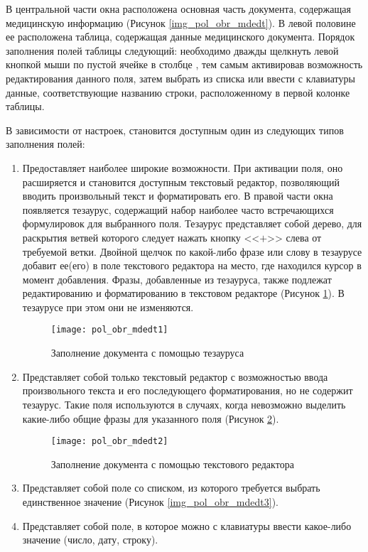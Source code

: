 В центральной части окна расположена основная часть документа, содержащая медицинскую информацию (Рисунок \ref{img_pol_obr_mdedt}). В левой половине ее расположена таблица, содержащая данные медицинского документа. Порядок заполнения полей таблицы следующий: необходимо дважды щелкнуть левой кнопкой мыши по пустой ячейке в столбце , тем самым активировав возможность редактирования данного поля, затем выбрать из списка или ввести с клавиатуры данные, соответствующие названию строки, расположенному в первой колонке таблицы.

В зависимости от настроек, становится доступным один из следующих типов заполнения полей:
\begin{enumerate}
 \item Предоставляет наиболее широкие возможности. При активации поля, оно расширяется и становится доступным текстовый редактор, позволяющий вводить произвольный текст и форматировать его. В правой части окна появляется тезаурус, содержащий набор наиболее часто встречающихся формулировок для выбранного поля. Тезаурус представляет собой дерево, для раскрытия ветвей которого следует нажать кнопку <<$+$>> слева от требуемой ветки. Двойной щелчок по какой-либо фразе или слову в тезаурусе добавит ее(его) в поле текстового редактора на место, где находился курсор в момент добавления. Фразы, добавленные из тезауруса, также подлежат редактированию и форматированию в текстовом редакторе (Рисунок \ref{img_pol_obr_mdedt1}). В тезаурусе при этом они не изменяются.
 
 \begin{figure}[ht!]\centering
  \texttt{[image: pol\_obr\_mdedt1]}
  \caption{Заполнение документа с помощью тезауруса}
  \label{img_pol_obr_mdedt1}
 \end{figure}
 
 \item Представляет собой только текстовый редактор с возможностью ввода произвольного текста и его последующего форматирования, но не содержит тезаурус. Такие поля используются в случаях, когда невозможно выделить какие-либо общие фразы для указанного поля (Рисунок \ref{img_pol_obr_mdedt2}).
 
  \begin{figure}[ht!]\centering
   \texttt{[image: pol\_obr\_mdedt2]}
   \caption{Заполнение документа с помощью текстового редактора}
   \label{img_pol_obr_mdedt2}
  \end{figure}
 
 \item Представляет собой поле со списком, из которого требуется выбрать единственное значение (Рисунок \ref{img_pol_obr_mdedt3}).
 \item Представляет собой поле, в которое можно с клавиатуры ввести какое-либо значение (число, дату, строку).
\end{enumerate}


